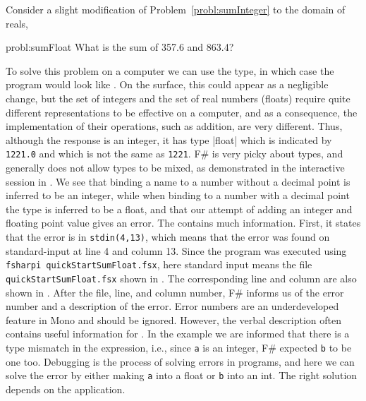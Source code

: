 \documentclass[springer.tex]{subfiles}
\begin{document}
Consider a slight modification of Problem~\ref{probl:sumInteger} to the domain of reals,
%
\begin{task}{probl:sumFloat}
  What is the sum of 357.6 and 863.4?
\end{task}
%
To solve this problem on a computer we can use the  type, in which case the program would look like .
%
%
On the surface, this could appear as a negligible change, but the set of integers and the set of real numbers (floats) require quite different representations to be effective on a computer, and as a consequence, the implementation of their operations, such as addition, are very different. Thus, although the response is an integer, it has type \keyword|float| which is indicated by \lstinline|1221.0| and which is not the same as \lstinline|1221|. F\# is very picky about types, and generally does not allow types to be mixed, as demonstrated in the interactive session in .
%
%
We see that binding a name to a number without a decimal point is inferred to be an integer, while when binding to a number with a decimal point the type is inferred to be a float, and that our attempt of adding an integer and floating point value gives an error. The  contains much information. First, it states that the error is in \lstinline[language=console]{stdin(4,13)}, which means that the error was found on standard-input at line 4 and column 13. Since the program was executed using \lstinline[language=console]{fsharpi quickStartSumFloat.fsx}, here standard input means the file \lstinline[language=console]{quickStartSumFloat.fsx} shown in . The corresponding line and column are also shown in . After the file, line, and column number, F\# informs us of the error number and a description of the error. Error numbers are an underdeveloped feature in Mono and should be ignored. However, the verbal description often contains useful information for . In the example we are informed that there is a type mismatch in the expression, i.e., since \lstinline{a} is an integer, F\# expected \lstinline{b} to be one too. Debugging is the process of solving errors in programs, and here we can solve the error by either making \lstinline{a} into a float or \lstinline{b} into an int. The right solution depends on the application.
\end{document}

